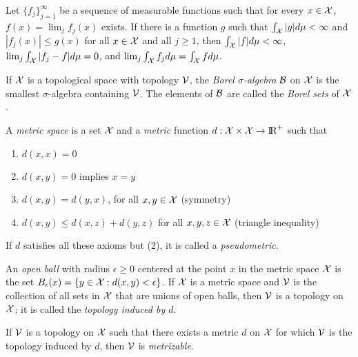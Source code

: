 \begin{Theorem}
        Let $\{f_j\}_{j=1}^\infty$ be a sequence of measurable functions such that
                for every $x \in {\cal X}$,
                $f(x) = \lim_j f_j(x)$ exists.
                If there is a function $g$ such that $\int_{\cal X} |g| d\mu < \infty$ and
                $|f_j(x)| \le g(x)$ for all $x \in {\cal X}$ and all $j \ge 1$, then
                $\int_{\cal X} |f| d\mu < \infty$, $\lim_j \int_{\cal X} | f_j - f | d\mu = 0$,
                and $\lim_j \int_{\cal X} f_j d\mu = \int_{\cal X} f d\mu$.
\end{Theorem}

\begin{Definition}
    If ${\cal X}$ is a topological space with topology ${\cal V}$, the {\em Borel $\sigma$-algebra\/}
    ${\cal B}$ on ${\cal X}$ is the smallest $\sigma$-algebra containing ${\cal V}$.
    The elements of ${\cal B}$ are called the {\em Borel sets\/} of ${\cal X}$.
\end{Definition}

\begin{Definition}
    A {\em metric space\/} is a set ${\cal X}$ and a {\em metric\/} function
    $d: {\cal X} \times {\cal X} \rightarrow \hbox{I\kern-.17em\hbox{R}}^+$ such that
    \begin{enumerate}
        \item  $d(x, x) = 0$
        \item  $d(x, y) = 0$ implies $x = y$
        \item  $d(x, y) = d(y, x)$, for all $x, y \in {\cal X}$ (symmetry)
        \item  $d(x, y) \le d(x, z) + d(y, z)$ for all
               $x, y, z \in {\cal X}$ (triangle inequality)
    \end{enumerate}
    If $d$ satisfies all these axioms but (2), it is called a {\em pseudometric\/}.
\end{Definition}

An {\em open ball\/} with radius $\epsilon \ge 0$ centered at the point $x$ in the metric space ${\cal X}$
is the set $B_\epsilon(x) = \{ y \in {\cal X} : d(x, y) < \epsilon\}$.
If ${\cal X}$ is a metric space and ${\cal V}$ is the collection of all sets in
${\cal X}$ that are unions of open balls, then ${\cal V}$ is a topology on ${\cal X}$; it
is called the {\em topology induced by $d$\/}.

If ${\cal V}$ is a topology on ${\cal X}$ such that there exists a metric $d$ on ${\cal X}$
for which ${\cal V}$ is the topology induced by $d$, then ${\cal V}$ is {\em metrizable\/}.

